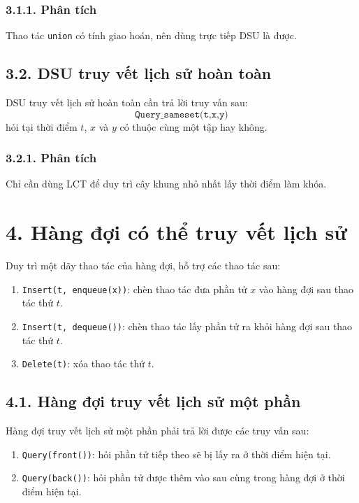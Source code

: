\documentclass[11pt]{article}
\begin{document}
\subsubsection*{3.1.1. Phân tích}

Thao tác \texttt{union} có tính giao hoán, nên dùng trực tiếp DSU là được.

\subsection*{3.2. DSU truy vết lịch sử hoàn toàn}

DSU truy vết lịch sử hoàn toàn cần trả lời truy vấn sau:
\[
\texttt{Query\_sameset(t,x,y)}
\]
hỏi tại thời điểm \(t\), \(x\) và \(y\) có thuộc cùng một tập hay không.

\subsubsection*{3.2.1. Phân tích}

Chỉ cần dùng LCT để duy trì cây khung nhỏ nhất lấy thời điểm làm khóa.

\section*{4. Hàng đợi có thể truy vết lịch sử}

Duy trì một dãy thao tác của hàng đợi, hỗ trợ các thao tác sau:

\begin{enumerate}
  \item \texttt{Insert(t, enqueue(x))}: chèn thao tác đưa phần tử \(x\) vào
        hàng đợi sau thao tác thứ \(t\).
  \item \texttt{Insert(t, dequeue())}: chèn thao tác lấy phần tử ra khỏi hàng
        đợi sau thao tác thứ \(t\).
  \item \texttt{Delete(t)}: xóa thao tác thứ \(t\).
\end{enumerate}

\subsection*{4.1. Hàng đợi truy vết lịch sử một phần}

Hàng đợi truy vết lịch sử một phần phải trả lời được các truy vấn sau:

\begin{enumerate}
  \item \texttt{Query(front())}: hỏi phần tử tiếp theo sẽ bị lấy ra ở thời điểm
        hiện tại.
  \item \texttt{Query(back())}: hỏi phần tử được thêm vào sau cùng trong hàng
        đợi ở thời điểm hiện tại.
\end{enumerate}
\end{document}
